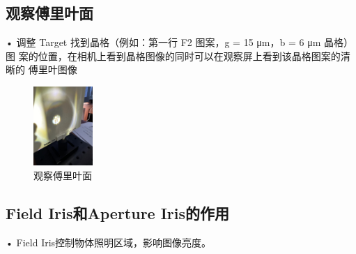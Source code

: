 \documentclass{ctexart}
\begin{document}
\subsection{观察傅里叶面}
• 调整 Target 找到晶格（例如：第一行 F2 图案，g = 15 μm，b = 6 μm 晶格）图
案的位置，在相机上看到晶格图像的同时可以在观察屏上看到该晶格图案的清晰的
傅里叶图像
\begin{figure}[htbp]
  \centering
  \includegraphics[width=0.2\textwidth,height=0.3\textwidth]{pictures/微信图片_20241010201008.jpg}
  \caption{观察傅里叶面} 
\end{figure}
\subsection{Field Iris和Aperture Iris的作用}
• Field Iris控制物体照明区域，影响图像亮度。
\end{document}

